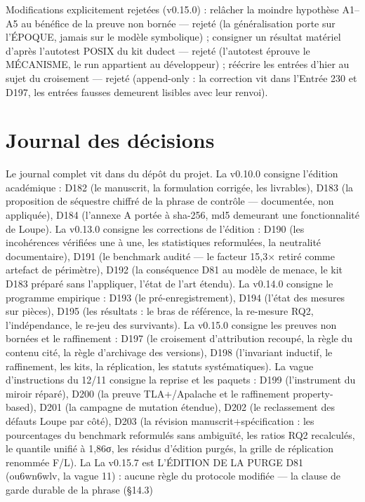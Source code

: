 Modifications explicitement rejetées (v0.15.0) : relâcher la moindre
hypothèse A1--A5 au bénéfice de la preuve non bornée — rejeté (la
généralisation porte sur l'ÉPOQUE, jamais sur le modèle symbolique) ;
consigner un résultat matériel d'après l'autotest POSIX du kit dudect —
rejeté (l'autotest éprouve le MÉCANISME, le run appartient au
développeur) ; réécrire les entrées d'hier au sujet du croisement —
rejeté (append-only : la correction vit dans l'Entrée 230 et D197, les
entrées fausses demeurent lisibles avec leur renvoi).

\section{Journal des décisions}\label{sec:decisions}

Le journal complet vit dans  du dépôt du projet. La
v0.10.0 consigne l'édition académique : D182 (le manuscrit, la formulation
corrigée, les livrables), D183 (la proposition de séquestre chiffré de la
phrase de contrôle — documentée, non appliquée), D184 (l'annexe A portée à
sha-256, md5 demeurant une fonctionnalité de Loupe). La v0.13.0 consigne
les corrections de l'édition : D190 (les incohérences vérifiées une à une,
les statistiques reformulées, la neutralité documentaire), D191 (le
benchmark audité — le facteur 15,3× retiré comme artefact de périmètre),
D192 (la conséquence D81 au modèle de menace, le kit D183 préparé sans
l'appliquer, l'état de l'art étendu). La v0.14.0 consigne le programme
empirique : D193 (le pré-enregistrement), D194 (l'état des mesures sur
pièces), D195 (les résultats : le bras de référence, la re-mesure RQ2,
l'indépendance, le re-jeu des survivants). La v0.15.0 consigne les
preuves non bornées et le raffinement : D197 (le croisement
d'attribution recoupé, la règle du contenu cité, la règle
d'archivage des versions), D198 (l'invariant inductif, le
raffinement, les kits, la réplication, les statuts systématiques). La
vague d'instructions du 12/11 consigne la reprise et les paquets :
D199 (l'instrument du miroir réparé), D200 (la preuve TLA+/Apalache et
le raffinement property-based), D201 (la campagne de mutation étendue),
D202 (le reclassement des défauts Loupe par côté), D203 (la révision
manuscrit+spécification : les pourcentages du benchmark reformulés sans
ambiguïté, les ratios RQ2 recalculés, le quantile unifié à 1,86σ, les
résidus d'édition purgés, la grille de réplication renommée F/L). La
La v0.15.7 est L'ÉDITION DE LA PURGE D81 (ou6wn6wlv, la vague 11) : aucune
règle du protocole modifiée — la clause de garde durable de la phrase (§14.3)

